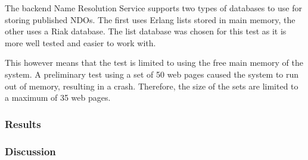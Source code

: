 The backend Name Resolution Service supports two types of databases to use for storing published NDOs. The first uses Erlang lists stored in main memory, the other uses a Riak database. The list database was chosen for this test as it is more well tested and easier to work with.

This however means that the test is limited to using the free main memory of the system. A preliminary test using a set of 50 web pages caused the system to run out of memory, resulting in a crash. Therefore, the size of the sets are limited to a maximum of 35 web pages.

\subsubsection{Results}



\subsubsection{Discussion}
